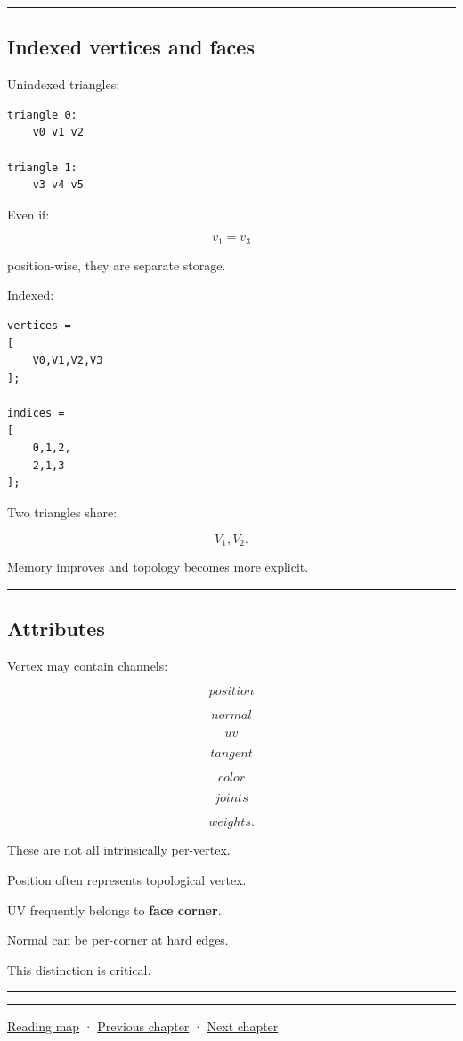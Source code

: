 \begin{center}\rule{0.5\linewidth}{0.5pt}\end{center}

\subsection{Indexed vertices and faces}\label{04-visual-computing-ii-ch040-indexed-vertices-and-faces}

Unindexed triangles:

\begin{verbatim}
triangle 0:
    v0 v1 v2

triangle 1:
    v3 v4 v5
\end{verbatim}

Even if:

\[
v_1=v_3
\]

position-wise, they are separate storage.

Indexed:

\begin{verbatim}
vertices =
[
    V0,V1,V2,V3
];

indices =
[
    0,1,2,
    2,1,3
];
\end{verbatim}

Two triangles share:

\[
V_1,V_2.
\]

Memory improves and topology becomes more explicit.

\begin{center}\rule{0.5\linewidth}{0.5pt}\end{center}

\subsection{Attributes}\label{04-visual-computing-ii-ch040-attributes}

Vertex may contain channels:

\[
position
\]

\[
normal
\]

\[
uv
\]

\[
tangent
\]

\[
color
\]

\[
joints
\]

\[
weights.
\]

These are not all intrinsically per-vertex.

Position often represents topological vertex.

UV frequently belongs to \textbf{face corner}.

Normal can be per-corner at hard edges.

This distinction is critical.

\begin{center}\rule{0.5\linewidth}{0.5pt}\end{center}

\begin{center}\rule{0.5\linewidth}{0.5pt}\end{center}

\hyperref[volume-reading-map]{Reading map} · \hyperref[04-visual-computing-ii-ch039-tiling-ordering-and-compositing-at-scale]{Previous chapter} · \hyperref[04-visual-computing-ii-ch041-per-vertex-and-per-corner-mesh-attributes]{Next chapter}
